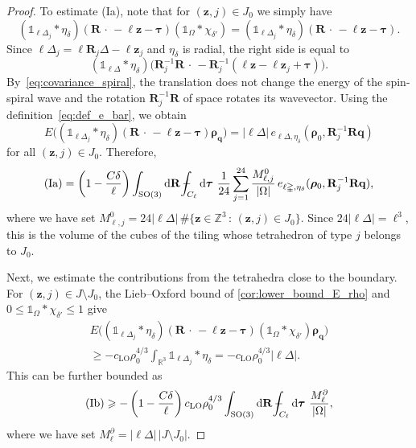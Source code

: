 \documentclass[final,reqno]{amsart}
\theoremstyle{remark}
\renewcommand{\le}{\leqslant}
\renewcommand{\ge}{\geqslant}
\newcommand{\RR}{\mathbb{R}}
\newcommand{\ZZ}{\mathbb{Z}}
\newcommand{\SO}{\mathrm{SO}}
\newcommand{\LO}{\mathrm{LO}}
\newcommand{\iden}{\mathbb{1}}
\newcommand{\tetra}{\mathbb{\Delta}}
\newcommand{\dd}{\mathrm{d}}
\def\Xint#1{\mathchoice
{\XXint\displaystyle\textstyle{#1}}
{\XXint\textstyle\scriptstyle{#1}}
{\XXint\scriptstyle\scriptscriptstyle{#1}}
{\XXint\scriptscriptstyle\scriptscriptstyle{#1}}
\!\int}
\def\XXint#1#2#3{{\setbox0=\hbox{$#1{#2#3}{\int}$ }
\vcenter{\hbox{$#2#3$ }}\kern-.6\wd0}}
\def\dashint{\Xint-}
\begin{document}
\begin{proof}
To estimate (Ia), note that for $(\mathbf{z},j)\in J_0$ we simply have
\[
 (\iden_{\ell\tetra_j}\ast\eta_\delta)(\mathbf{R}\,\cdot\,-\ell\mathbf{z}-\bm{\tau})(\iden_\Omega\ast\chi_{\delta'})
 =(\iden_{\ell\tetra_j}\ast\eta_\delta)(\mathbf{R}\,\cdot\,-\ell\mathbf{z}-\bm{\tau}).
\]
Since $\ell\tetra_j=\ell\mathbf{R}_j\tetra-\ell\mathbf{z}_j$ and $\eta_\delta$ is radial, the right side is equal to
\[
 (\iden_{\ell\tetra}\ast\eta_\delta)\big(\mathbf{R}_j^{-1}\mathbf{R}\,\cdot\,-\mathbf{R}_j^{-1}(\ell\mathbf{z}-\ell\mathbf{z}_j+\bm{\tau})\big).
\]
By~\cref{eq:covariance_spiral}, the translation does not change the energy of the spin-spiral wave and the rotation $\mathbf{R}_j^{-1}\mathbf{R}$ of space rotates its wavevector. Using the definition~\cref{eq:def_e_bar}, we obtain
\[
 E\Big((\iden_{\ell\tetra_j}\ast\eta_\delta)(\mathbf{R}\,\cdot\,-\ell\mathbf{z}-\bm{\tau})\bm{\rho}_{\mathbf{q}}\Big)
 =|\ell\tetra|\,e_{\ell\tetra,\eta_\delta}(\bm{\rho}_0,\mathbf{R}_j^{-1}\mathbf{R}\mathbf{q})
\]
for all $(\mathbf{z},j)\in J_0$. Therefore,
\[
 \mathrm{(Ia)}=\left(1-\frac{C\delta}{\ell}\right)\int_{\SO(3)}\dd\mathbf{R}\,\dashint_{C_\ell}\dd\bm{\tau}\
 \frac1{24}\sum_{j=1}^{24}\frac{M^0_{\ell,j}}{|\Omega|}\,
 e_{\ell\tetra,\eta_\delta}(\bm{\rho}_0,\mathbf{R}_j^{-1}\mathbf{R}\mathbf{q}),
\]
where we have set $M^0_{\ell,j}=24|\ell\tetra|\,\#\{\mathbf{z}\in\ZZ^3\,:\,(\mathbf{z},j)\in J_0\}$. Since $24|\ell\tetra|=\ell^3$, this is the volume of the cubes of the tiling whose tetrahedron of type $j$ belongs to $J_0$.

Next, we estimate the contributions from the tetrahedra close to the boundary. For $(\mathbf{z},j)\in J\setminus J_0$, the Lieb--Oxford bound of \cref{cor:lower_bound_E_rho} and $0\le\iden_\Omega\ast\chi_{\delta'}\le1$ give
\begin{multline*}
 E\Big((\iden_{\ell\tetra_j}\ast\eta_\delta)(\mathbf{R}\,\cdot\,-\ell\mathbf{z}-\bm{\tau})(\iden_\Omega\ast\chi_{\delta'})\bm{\rho}_{\mathbf{q}}\Big)\\
 \ge-c_\LO\rho_0^{4/3}\int_{\RR^3}\iden_{\ell\tetra_j}\ast\eta_\delta
 =-c_\LO\rho_0^{4/3}|\ell\tetra|.
\end{multline*}
This can be further bounded as
\[
 \mathrm{(Ib)}\ge-\left(1-\frac{C\delta}{\ell}\right)c_\LO\rho_0^{4/3}
 \int_{\SO(3)}\dd\mathbf{R}\,\dashint_{C_\ell}\dd\bm{\tau}\ \frac{M^\partial_\ell}{|\Omega|},
\]
where we have set $M^\partial_\ell=|\ell\tetra|\,|J\setminus J_0|$.


\end{proof}
\end{document}
